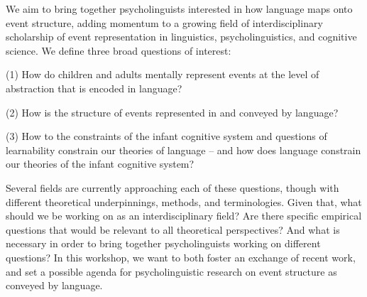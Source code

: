 \documentclass[12pt]{article}
\begin{document}
We aim to bring together psycholinguists interested in how language maps onto event structure, adding momentum to a growing field of interdisciplinary scholarship of event representation in linguistics, psycholinguistics, and cognitive science. We define three broad questions of interest:

(1) How do children and adults mentally represent events at the level of abstraction that is encoded in language?

(2) How is the structure of events represented in and conveyed by language?

(3) How to the constraints of the infant cognitive system and questions of learnability constrain our theories of language – and how does language constrain our theories of the infant cognitive system?

Several fields are currently approaching each of these questions, though with different theoretical underpinnings, methods, and terminologies. Given that, what should we be working on as an interdisciplinary field? Are there specific empirical questions that would be relevant to all theoretical perspectives? And what is necessary in order to bring together psycholinguists working on different questions? In this workshop, we want to both foster an exchange of recent work, and set a possible agenda for psycholinguistic research on event structure as conveyed by language.

\newpage
\end{document}
